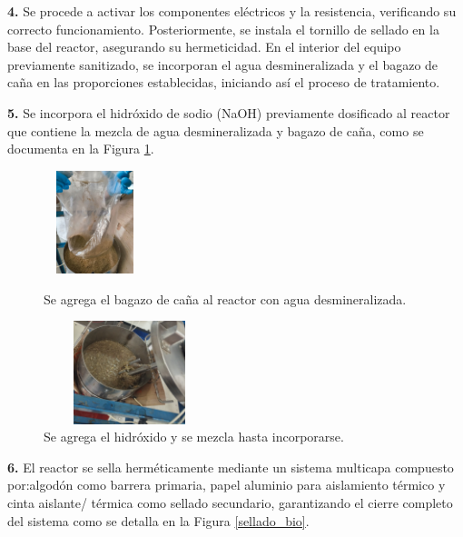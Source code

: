 \documentclass[12pt]{article}
\begin{document}
			\textbf{4.} Se procede a activar los componentes eléctricos y la resistencia, verificando su correcto funcionamiento. Posteriormente, se instala el tornillo de sellado en la base del reactor, asegurando su hermeticidad. En el interior del equipo previamente sanitizado, se incorporan el agua desmineralizada y el bagazo de caña en las proporciones establecidas, iniciando así el proceso de tratamiento. 
			
			\textbf{5.} Se incorpora el hidróxido de sodio (NaOH) previamente dosificado al reactor que contiene la mezcla de agua desmineralizada y bagazo de caña,  como se documenta en la Figura \ref{bagazo con hidroxido}.
		
					
					\begin{figure}[H]
				\centering
				\begin{minipage}{0.46\textwidth}
					\centering
					\includegraphics[width=3cm, height=3cm]{imagenes/agua con bagazo}
					\caption{Se agrega el bagazo de caña al reactor con agua desmineralizada.}
					\label{agua con bagazo}
				\end{minipage}
				\hfill
				\begin{minipage}{0.48\textwidth}
					\centering
				\includegraphics[width=5cm, height=3cm]{imagenes/bagazo con hidroxido1}
				\caption{Se agrega el hidróxido y se mezcla hasta incorporarse.}
				\label{bagazo con hidroxido}
				\end{minipage}
			\end{figure}
			
			
			\textbf{6.} El reactor se sella herméticamente mediante un sistema multicapa compuesto por:algodón como barrera primaria, papel aluminio para aislamiento térmico y cinta aislante/ térmica como sellado secundario, garantizando el cierre completo del sistema como se detalla en la Figura \ref{sellado_bio}.
			
			
			
\end{document}
